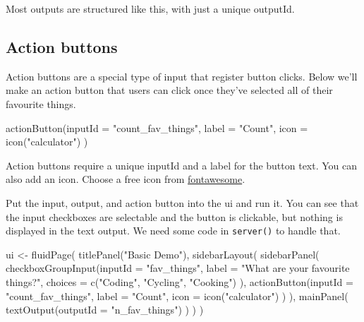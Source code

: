 \documentclass[
]{book}
\newenvironment{Shaded}{\begin{snugshade}}{\end{snugshade}}
\newcommand{\AttributeTok}[1]{\textcolor[rgb]{0.77,0.63,0.00}{#1}}
\newcommand{\FunctionTok}[1]{\textcolor[rgb]{0.00,0.00,0.00}{#1}}
\newcommand{\NormalTok}[1]{#1}
\newcommand{\OtherTok}[1]{\textcolor[rgb]{0.56,0.35,0.01}{#1}}
\newcommand{\StringTok}[1]{\textcolor[rgb]{0.31,0.60,0.02}{#1}}
\begin{document}
Most outputs are structured like this, with just a unique outputId.

\hypertarget{action-buttons}{%
\subsection{Action buttons}\label{action-buttons}}

Action buttons are a special type of input that register button clicks. Below we'll make an action button that users can click once they've selected all of their favourite things.

\begin{Shaded}
\begin{Highlighting}[]
\FunctionTok{actionButton}\NormalTok{(}\AttributeTok{inputId =} \StringTok{"count\_fav\_things"}\NormalTok{,}
             \AttributeTok{label =} \StringTok{"Count"}\NormalTok{,}
             \AttributeTok{icon =} \FunctionTok{icon}\NormalTok{(}\StringTok{"calculator"}\NormalTok{)}
\NormalTok{)}
\end{Highlighting}
\end{Shaded}

Action buttons require a unique inputId and a label for the button text. You can also add an icon. Choose a free icon from \href{https://fontawesome.com/icons?d=gallery\&m=free}{fontawesome}.

Put the input, output, and action button into the ui and run it. You can see that the input checkboxes are selectable and the button is clickable, but nothing is displayed in the text output. We need some code in \texttt{server()} to handle that.

\begin{Shaded}
\begin{Highlighting}[]
\NormalTok{ui }\OtherTok{\textless{}{-}} \FunctionTok{fluidPage}\NormalTok{(}
   \FunctionTok{titlePanel}\NormalTok{(}\StringTok{"Basic Demo"}\NormalTok{),}
   \FunctionTok{sidebarLayout}\NormalTok{(}
      \FunctionTok{sidebarPanel}\NormalTok{(}
         \FunctionTok{checkboxGroupInput}\NormalTok{(}\AttributeTok{inputId =} \StringTok{"fav\_things"}\NormalTok{, }
                   \AttributeTok{label =} \StringTok{"What are your favourite things?"}\NormalTok{,}
                   \AttributeTok{choices =} \FunctionTok{c}\NormalTok{(}\StringTok{"Coding"}\NormalTok{, }\StringTok{"Cycling"}\NormalTok{, }\StringTok{"Cooking"}\NormalTok{)}
\NormalTok{         ),}
         \FunctionTok{actionButton}\NormalTok{(}\AttributeTok{inputId =} \StringTok{"count\_fav\_things"}\NormalTok{,}
             \AttributeTok{label =} \StringTok{"Count"}\NormalTok{,}
             \AttributeTok{icon =} \FunctionTok{icon}\NormalTok{(}\StringTok{"calculator"}\NormalTok{)}
\NormalTok{         )}
\NormalTok{      ),}
      \FunctionTok{mainPanel}\NormalTok{(}
         \FunctionTok{textOutput}\NormalTok{(}\AttributeTok{outputId =} \StringTok{"n\_fav\_things"}\NormalTok{)}
\NormalTok{      )}
\NormalTok{   )}
\NormalTok{)}
\end{Highlighting}
\end{Shaded}
\end{document}
